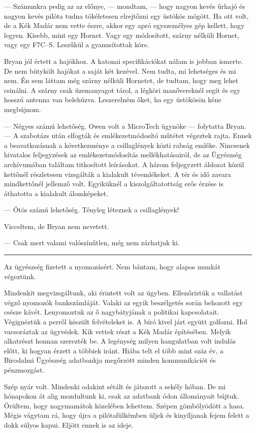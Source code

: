 \documentclass[10pt]{memoir}
\renewcommand{\pfbreakdisplay}{\bigskip \ding{70} \bigskip}
\newcommand{\secbreak}{\fancybreak{\pfbreakdisplay}}
\begin{document}
--- Számunkra pedig az az előnye, --- mondtam, --- hogy nagyon kevés űrhajó és
nagyon kevés pilóta tudna tökéletesen elrejtőzni egy üstökös mögött. Ha ott
volt, de a Kék Madár nem vette észre, akkor egy apró egyszemélyes gép kellett,
hogy legyen. Kisebb, mint egy Hornet. Vagy egy módosított, szárny nélküli
Hornet, vagy egy F7C--S. Leszűkül a gyanusítottak köre.

Bryan jól értett a hajókhoz. A katonai specifikációkat nálam is jobban ismerte.
De nem bütykölt hajókat a saját két kezével. Nem tudta, mi lehetséges és mi
nem. Én sem láttam még szárny nélküli Hornetet, de tudtam, hogy meg lehet
csinálni. A szárny csak üzemanyagot tárol, a légköri manővereknél segít és egy
hosszú antenna van belehúzva. Leszerelném őket, ha egy üstökösön kéne
megbújnom.

--- Négyes számú lehetőség. Owen volt a MicroTech ügynöke --- folytatta Bryan.
--- A szabotázs után elfogták és emlékezetmódosító műtétet végeztek rajta.
Ennek a beavatkozásnak a következménye a csillaglények közti rabság emléke.
Nincsenek hivatalos feljegyzések az emlékezetmódosítás mellékhatásairól, de az
Ügyészség archívumában találtam titkosított leírásokat. A három feljegyzett
áldozat közül kettőnél részletesen vizsgálták a kialakult tévemlékeket. A tér
és idő zavara mindkettőnél jellemző volt. Egyiküknél a kiszolgáltatottság erős
érzése is áthatotta a kialakult álomképeket.

--- Ötös számú lehetőség. Tényleg léteznek a csillaglények!

Vicceltem, de Bryan nem nevetett.

--- Csak mert valami valószínűtlen, még nem zárhatjuk ki.

\secbreak

Az ügyészség fizetett a nyomozásért. Nem bántam, hogy alapos munkát végeztünk.

Mindenkit megvizsgáltunk, aki érintett volt az ügyben. Ellenőriztük a vallatást
végző nyomozók bankszámláját. Valaki az egyik beszélgetés során behozott egy
csésze kávét. Lenyomoztuk az ő nagybátyjának a politikai kapcsolatait.
Végignéztük a perről készült felvételeket is. A bíró kivel járt együtt
golfozni. Hol vacsoráztak az ügyvédek. Kik vettek részt a Kék Madár építésében.
Melyik alkatrészt honnan szerezték be. A legénység milyen hangulatban volt
indulás előtt, ki hogyan érzett a többiek iránt. Hiába telt el több mint száz
év, a Birodalmi Ügyészség adatbankja megőrzött minden kommunikációt és
pénzmozgást.

Szép nyár volt. Mindenki odakint sétált és játszott a sekély hóban. De mi
hónapokon át alig mozdultunk ki, csak az adatbank ódon állományait bújtuk.
Örültem, hogy nagymamátok közelében lehettem. Szépen gömbölyödött a hasa. Mégis
vágytam rá, hogy újra a pilótafülkémben üljek és kinyíljanak fejem felett a
dokk súlyos kapui. Eljött ennek is az ideje.
\end{document}
